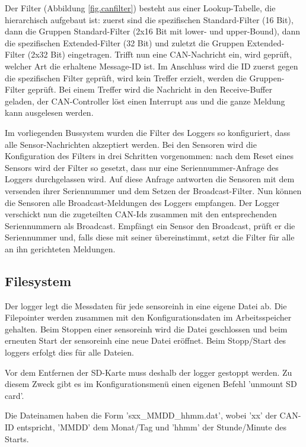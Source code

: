 Der Filter (Abbildung \ref{fig.canfilter}) besteht aus einer Lookup-Tabelle, die hierarchisch aufgebaut ist: zuerst sind die spezifischen Standard-Filter (16 Bit), dann die Gruppen Standard-Filter (2x16 Bit mit lower- und upper-Bound), dann die spezifischen Extended-Filter (32 Bit) und zuletzt die Gruppen Extended-Filter (2x32 Bit) eingetragen. Trifft nun eine CAN-Nachricht ein, wird geprüft, welcher Art die erhaltene Message-ID ist. Im Anschluss wird die ID zuerst gegen die spezifischen Filter geprüft, wird kein Treffer erzielt, werden die Gruppen-Filter geprüft. Bei einem Treffer wird die Nachricht in den Receive-Buffer geladen, der CAN-Controller löst einen Interrupt aus und die ganze Meldung kann ausgelesen werden.

Im vorliegenden Bussystem wurden die Filter des Loggers so konfiguriert, dass alle Sensor-Nachrichten akzeptiert werden. Bei den Sensoren wird die Konfiguration des Filters in drei Schritten vorgenommen: nach dem Reset eines Sensors wird der Filter so gesetzt, dass nur eine Seriennummer-Anfrage des Loggers durchgelassen wird. Auf diese Anfrage antworten die Sensoren mit dem versenden ihrer Seriennummer und dem Setzen der Broadcast-Filter. Nun können die Sensoren alle Broadcast-Meldungen des Loggers empfangen. Der Logger verschickt nun die zugeteilten CAN-Ids zusammen mit den entsprechenden Seriennummern als Broadcast. Empfängt ein Sensor den Broadcast, prüft er die Seriennummer und, falls diese mit seiner übereinstimmt, setzt die Filter für alle an ihn gerichteten Meldungen.

\subsection{Filesystem}\label{subsec.sw_filesystem}
Der \gls{logger} legt die Messdaten für jede \gls{sensoreinh} in eine eigene Datei ab. Die Filepointer werden zusammen mit den Konfigurationsdaten im Arbeitsspeicher gehalten. Beim Stoppen einer \gls{sensoreinh} wird die Datei geschlossen und beim erneuten Start der \gls{sensoreinh} eine neue Datei eröffnet. Beim Stopp/Start des \gls{logger}s erfolgt dies für alle Dateien.

Vor dem Entfernen der SD-Karte muss deshalb der \gls{logger} gestoppt werden. Zu diesem Zweck gibt es im Konfigurationsmenü einen eigenen Befehl 'unmount SD card'.

Die Dateinamen haben die Form 'sxx\_MMDD\_hhmm.dat', wobei 'xx' der CAN-ID entspricht, 'MMDD' dem Monat/Tag und 'hhmm' der Stunde/Minute des Starts.

